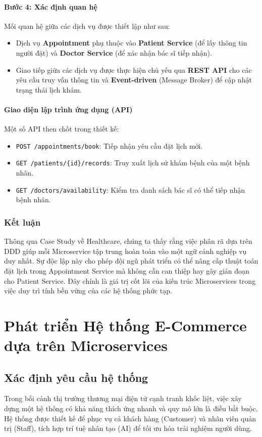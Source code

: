\documentclass[12pt,a4paper]{report}
\begin{document}
\subsubsection{Bước 4: Xác định quan hệ}
Mối quan hệ giữa các dịch vụ được thiết lập như sau:
\begin{itemize}
    \item Dịch vụ \textbf{Appointment} phụ thuộc vào \textbf{Patient Service} (để lấy thông tin người đặt) và \textbf{Doctor Service} (để xác nhận bác sĩ tiếp nhận).
    \item Giao tiếp giữa các dịch vụ được thực hiện chủ yếu qua \textbf{REST API} cho các yêu cầu truy vấn thông tin và \textbf{Event-driven} (Message Broker) để cập nhật trạng thái lịch khám.
\end{itemize}

\subsubsection{Giao diện lập trình ứng dụng (API)}
Một số API then chốt trong thiết kế:
\begin{itemize}
    \item \texttt{POST /appointments/book}: Tiếp nhận yêu cầu đặt lịch mới.
    \item \texttt{GET /patients/\{id\}/records}: Truy xuất lịch sử khám bệnh của một bệnh nhân.
    \item \texttt{GET /doctors/availability}: Kiểm tra danh sách bác sĩ có thể tiếp nhận bệnh nhân.
\end{itemize}

\subsection{Kết luận}
Thông qua Case Study về Healthcare, chúng ta thấy rằng việc phân rã dựa trên DDD giúp mỗi Microservice tập trung hoàn toàn vào một ngữ cảnh nghiệp vụ duy nhất. Sự độc lập này cho phép đội ngũ phát triển có thể nâng cấp thuật toán đặt lịch trong Appointment Service mà không cần can thiệp hay gây gián đoạn cho Patient Service. Đây chính là giá trị cốt lõi của kiến trúc Microservices trong việc duy trì tính bền vững của các hệ thống phức tạp.

\chapter{Phát triển Hệ thống E-Commerce dựa trên Microservices}

\section{Xác định yêu cầu hệ thống}
Trong bối cảnh thị trường thương mại điện tử cạnh tranh khốc liệt, việc xây dựng một hệ thống có khả năng thích ứng nhanh và quy mô lớn là điều bắt buộc. Hệ thống được thiết kế để phục vụ cả khách hàng (Customer) và nhân viên quản trị (Staff), tích hợp trí tuệ nhân tạo (AI) để tối ưu hóa trải nghiệm người dùng.
\end{document}
